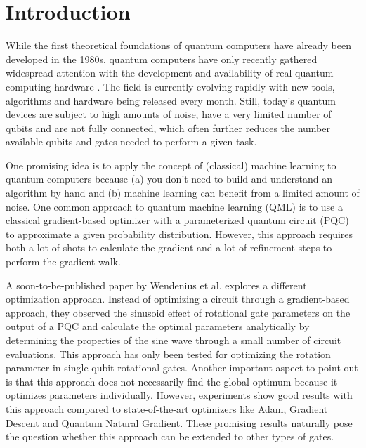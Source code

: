 \chapter{Introduction}
\label{chap:intro}


While the first theoretical foundations of quantum computers have already been
developed in the 1980s, quantum computers have only recently gathered widespread
attention with the development and availability of real quantum computing
hardware \cite{nielsen_quantum_2007,hidary_quantum_2021}.
The field is currently evolving rapidly with new tools, algorithms and hardware
being released every month. %
Still, today's quantum devices are subject to high amounts of noise, have a very
limited number of qubits and are not fully connected, which often further
reduces the number available qubits and gates needed to perform a given task.

One promising idea is to apply the concept of (classical) machine learning to
quantum computers because (a) you don't need to build and understand an
algorithm by hand and (b) machine learning can benefit from a limited amount of
noise.
One common approach to quantum machine learning (QML) is to use a classical
gradient-based optimizer with a parameterized quantum circuit (PQC) to
approximate a given probability distribution.
However, this approach requires both a lot of shots to calculate the gradient
and a lot of refinement steps to perform the gradient walk.

A soon-to-be-published paper by Wendenius et al.
\cite{wendenius_gradient-free_2023} explores a different optimization approach.
Instead of optimizing a circuit through a gradient-based approach, they observed
the sinusoid effect of rotational gate parameters on the output of a PQC and
calculate the optimal parameters analytically by determining the properties of
the sine wave through a small number of circuit evaluations. 
This approach has only been tested for optimizing the rotation parameter in
single-qubit rotational gates.
Another important aspect to point out is that this approach does not necessarily
find the global optimum because it optimizes parameters individually.
However, experiments show good results with this approach compared to
state-of-the-art optimizers like Adam, Gradient Descent and Quantum Natural
Gradient.
These promising results naturally pose the question whether this approach can be
extended to other types of gates.

